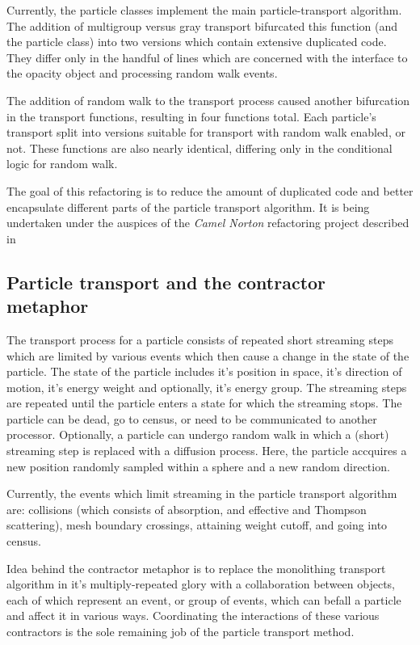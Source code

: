 \documentclass[memo]{ResearchNote}
\begin{document}
Currently, the particle classes implement the main particle-transport
algorithm.  The addition of multigroup versus gray transport
bifurcated this function (and the particle class) into two versions
which contain extensive duplicated code. They differ only in the
handful of lines which are concerned with the interface to the opacity
object and processing random walk events.

The addition of random walk to the transport process caused another
bifurcation in the transport functions, resulting in four functions
total. Each particle's transport split into versions suitable for
transport with random walk enabled, or not. These functions are also
nearly identical, differing only in the conditional logic for random
walk.

The goal of this refactoring is to reduce the amount of duplicated
code and better encapsulate different parts of the particle transport
algorithm. It is being undertaken under the auspices of the {\em Camel
  Norton} refactoring project described in~\cite{ccs-4:04-13}

\subsection{Particle transport and the contractor metaphor}

The transport process for a particle consists of repeated short
streaming steps which are limited by various events which then cause a
change in the state of the particle. The state of the particle
includes it's position in space, it's direction of motion, it's energy
weight and optionally, it's energy group. The streaming steps are
repeated until the particle enters a state for which the streaming
stops. The particle can be dead, go to census, or need to be
communicated to another processor. Optionally, a particle can undergo
random walk in which a (short) streaming step is replaced with a
diffusion process. Here, the particle accquires a new position
randomly sampled within a sphere and a new random direction.

Currently, the events which limit streaming in the particle transport
algorithm are: collisions (which consists of absorption, and effective
and Thompson scattering), mesh boundary crossings, attaining weight
cutoff, and going into census.

Idea behind the contractor metaphor is to replace the monolithing
transport algorithm in it's multiply-repeated glory with a
collaboration between objects, each of which represent an event, or
group of events, which can befall a particle and affect it in various
ways. Coordinating the interactions of these various contractors is
the sole remaining job of the particle transport method.
\end{document}
